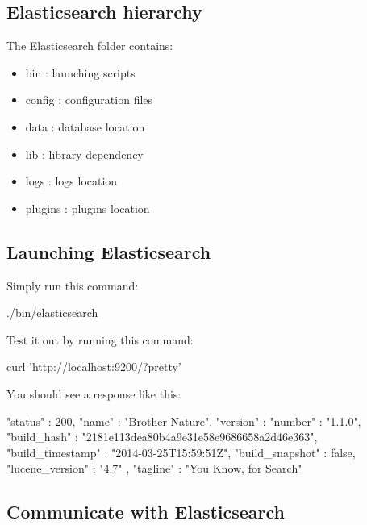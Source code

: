 \documentclass[]{beamer}
\begin{document}
\subsection{Elasticsearch hierarchy}

\begin{frame}{\subsecname{}}
  The Elasticsearch folder contains:

  \begin{itemize}
    \item bin : launching scripts
    \item config : configuration files
    \item data : database location
    \item lib : library dependency
    \item logs : logs location
    \item plugins : plugins location
  \end{itemize}
\end{frame}

\subsection{Launching Elasticsearch}

\begin{frame}[containsverbatim]{\subsecname{}}
  Simply run this command:
  \begin{command}
./bin/elasticsearch
  \end{command}
\end{frame}

\begin{frame}[containsverbatim]{\subsecname{}}
  Test it out by running this command:
  \begin{command}
curl 'http://localhost:9200/?pretty'
  \end{command}

  You should see a response like this:
  \begin{command}
{
  "status" : 200,
  "name" : "Brother Nature",
  "version" : {
    "number" : "1.1.0",
    "build_hash" : "2181e113dea80b4a9e31e58e9686658a2d46e363",
    "build_timestamp" : "2014-03-25T15:59:51Z",
    "build_snapshot" : false,
    "lucene_version" : "4.7"
  },
  "tagline" : "You Know, for Search"
}
  \end{command}
\end{frame}

\subsection{Communicate with Elasticsearch}
\end{document}

